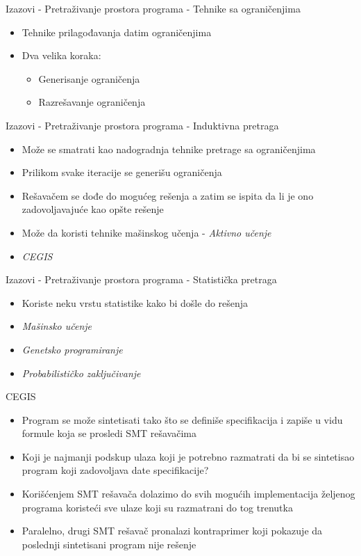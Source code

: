 \documentclass{beamer}
\begin{document}
\begin{frame}{Izazovi - Pretraživanje prostora programa - Tehnike sa ograničenjima}
    \begin{itemize}
        \item Tehnike prilagođavanja datim ograničenjima
        \item Dva velika koraka:
            \begin{itemize}
                \item Generisanje ograničenja
                \item Razrešavanje ograničenja
            \end{itemize}
    \end{itemize}
\end{frame}

\begin{frame}{Izazovi - Pretraživanje prostora programa - Induktivna pretraga}
    \begin{itemize}
        \item Može se smatrati kao nadogradnja tehnike pretrage sa ograničenjima
        \item Prilikom svake iteracije se generišu ograničenja
        \item Rešavačem se dođe do mogućeg rešenja a zatim se ispita da li je ono zadovoljavajuće kao opšte rešenje
        \item Može da koristi tehnike mašinskog učenja - \emph{Aktivno učenje}
        \item \emph{CEGIS}
    \end{itemize}
\end{frame}

\begin{frame}{Izazovi - Pretraživanje prostora programa - Statistička pretraga}
    \begin{itemize}
        \item Koriste neku vrstu statistike kako bi došle do rešenja
        \item \emph{Mašinsko učenje}
        \item \emph{Genetsko programiranje}
        \item \emph{Probabilističko zaključivanje}
    \end{itemize}
\end{frame}

\begin{frame}{CEGIS}
    \begin{itemize}
        \item Program se može sintetisati tako što se definiše specifikacija i zapiše u vidu formule koja se prosledi SMT rešavačima
        \item Koji je najmanji podskup ulaza koji je potrebno razmatrati da bi se sintetisao program koji zadovoljava date specifikacije?
        \item Korišćenjem SMT rešavača dolazimo do svih mogućih implementacija željenog programa koristeći sve ulaze koji su razmatrani do tog trenutka
        \item Paralelno, drugi SMT rešavač pronalazi kontraprimer koji pokazuje da poslednji sintetisani program nije rešenje
    \end{itemize}
\end{frame}
\end{document}
